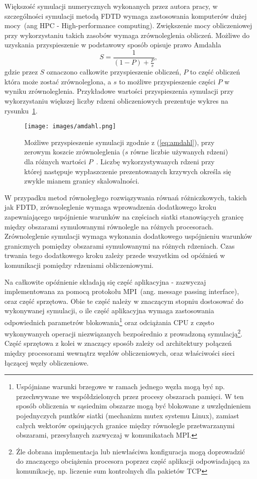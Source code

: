 
Większość symulacji numerycznych wykonanych przez autora pracy, w szczególności symulacji metodą FDTD wymaga zastosowania komputerów dużej mocy~(ang HPC - High-performance computing). Zwiększenie mocy obliczeniowej przy wykorzystaniu takich zasobów wymaga zrównoleglenia obliczeń. Możliwe do uzyskania przyspieszenie w podstawowy sposób opisuje prawo Amdahla
\begin{equation}
	S=\frac{1}{(1-P)+\frac{P}{s}},
	\label{eq:amdahl}
\end{equation}
gdzie przez $S$ oznaczono całkowite przyspieszenie obliczeń, $P$ to część obliczeń która może zostać zrównoleglona, a $s$ to możliwe przyspieszenie części $P$ w wyniku zrównoleglenia. Przykładowe wartości przyspieszenia symulacji przy wykorzystaniu większej liczby rdzeni obliczeniowych prezentuje wykres na rysunku~\ref{fig:amdhal}.

\begin{figure}[h]
	\texttt{[image: images/amdahl.png]}
	\caption{Możliwe przyspieszenie symulacji zgodnie z (\ref{eq:amdahl}), przy zerowym koszcie zrównoleglenia ($s$ równe liczbie używanych rdzeni) dla różnych wartości $P$~\cite{wiki:amdhal}. Liczbę wykorzystywanych rdzeni przy której następuje wypłaszczenie prezentowanych krzywych określa się zwykle mianem granicy skalowalności.}
	\label{fig:amdhal}
\end{figure}

W przypadku metod równoległego rozwiązywania równań różniczkowych, takich jak FDTD, zrównoleglenie wymaga wprowadzenia dodatkowego kroku zapewniającego uspójnienie warunków na częściach siatki stanowiących granicę między obszarami symulowanymi równolegle na różnych procesorach. Zrównoleglenie symulacji wymaga wykonania dodatkowego uspójnieniu warunków granicznych pomiędzy obszarami symulowanymi na różnych rdzeniach. Czas trwania tego dodatkowego kroku zależy przede wszystkim od opóźnień w komunikacji pomiędzy rdzeniami obliczeniowymi. 

Na całkowite opóźnienie składają się część aplikacyjna - zazwyczaj implementowana za pomocą protokołu MPI~(ang. message passing interface), oraz część sprzętowa. Obie te część należy w znaczącym stopniu dostosować do wykonywanej symulacji, o ile część aplikacyjna wymaga zastosowania odpowiednich parametrów blokowania\footnote{Uspójniane warunki brzegowe w ramach jednego węzła mogą być np. przechwywane we współdzielonych przez procesy obszarach pamięci. W ten sposób obliczenia w sąsiednim obszarze mogą być blokowane z uwzlędnieniem pojednyczych puntków siatki (mechanizm mutex systemu Linux), zamiast całych wektorów opsiujących granice między równolegle przetwarzanymi obszarami, przesyłanych zazwyczaj w komunikatach MPI.} oraz odciążania CPU z często wykonywanych operacji niezwiązanych bezpośrednio z prowadzoną symulacją\footnote{Źle dobrana implementacja lub niewłaściwa konfiguracja mogą doprowadzić do znaczącego obciążenia procesora poprzez część aplikacji odpowiadającą za komunikację, np. liczenie sum kontrolnych dla pakietów TCP}. Część sprzętowa z kolei w znaczący sposób zależy od architektury połączeń między procesorami wewnątrz węzłów obliczeniowych, oraz właściwości sieci łączącej węzły obliczeniowe. 

